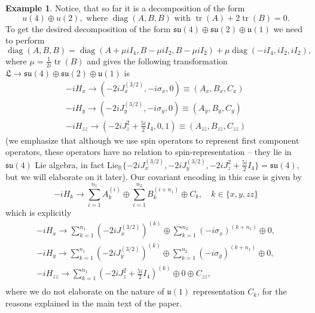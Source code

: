 \documentclass[10pt,twocolumn,superscriptaddress,aps,amsmath,amssymb,citeautoscript,floatfix,prx]{revtex4-2}
\newcounter{alg}
\theoremstyle{plain}
\theoremstyle{plain}
\theoremstyle{plain}
\theoremstyle{plain}
\theoremstyle{plain}
\theoremstyle{plain}
\newcommand{\R}{\mathbb{R}}
\newcommand{\Lie}{\mathrm{Lie}}
\theoremstyle{plain}
\theoremstyle{definition}
\newtheorem{smexample}[smtheorem]{Example}
\theoremstyle{plain}
\begin{document}
\begin{appendix}
\begin{smexample}
Notice, that so far it is a decomposition of the form
\[
    u(4) \oplus u(2),\text { where } \operatorname{diag}(A, B, B) \text { with } \operatorname{tr}(A)+2 \operatorname{tr}(B)=0.
\]
To get the desired decomposition of the form $\mathfrak{su}(4)\oplus \mathfrak{su}(2)\oplus \mathfrak{u}(1)$  we need to perform
\[
   \operatorname{diag}(A, B, B)=\operatorname{diag}(A+\mu i I_4, B-\mu i I_2, B-\mu i I_2) + \mu\operatorname{diag}\left(-i I_4, i I_2, i I_2\right),
\]
where $\mu=\frac{1}{2 i} \operatorname{tr}(B)$ and gives the following transformation $\mathfrak{L} \rightarrow \mathfrak{su}(4)\oplus \mathfrak{su}(2)\oplus \mathfrak{u}(1)$ is 
\[
\begin{gathered}
    -i H_x \longrightarrow \left(-2 i J_x^{(3 / 2)}, -i \sigma_x, 0 \right)\equiv \left(A_x, B_x, C_x \right) \\
    -i H_y \longrightarrow \left(-2 i J_y^{(3 / 2)}, -i \sigma_y, 0 \right)\equiv \left(A_y, B_y, C_y \right) \\
    -i H_{z z} \longrightarrow \left(-2 i J_z^2+\frac{5 i}{2} I_4, 0, 1\right)\equiv \left(A_{zz}, B_{zz}, C_{zz} \right)
\end{gathered}
\]
(we emphasize that although we use spin operators to represent first component operators, these operators have no relation to spin-representation -- they lie in $\mathfrak{su}(4)$ Lie algebra,
in fact $\Lie_{\R} \{-2 i J_x^{(3 / 2)}, -2 i J_y^{(3 / 2)}, -2 i J_z^2+\frac{5 i}{2} I_4\}=\mathfrak{su}(4)$, but we will elaborate on it later).
Our covariant encoding in this case is given by
\[
    -iH_k \longrightarrow \sum_{i=1}^{n_1} A_k^{(i)} \oplus \sum_{i=1}^{n_2} B_k^{(i+n_1)} \oplus C_k, \quad k\in\{x,y,zz\}
\]
which is explicitly
\[
\begin{gathered}
    -i H_x \longrightarrow \sum_{k=1}^{n_1} \left(-2 i J_x^{(3 / 2)}\right)^{(k)} \oplus \sum_{k=1}^{n_2} \left( -i \sigma_x\right)^{(k+n_1)}\oplus 0,\\
    -i H_y \longrightarrow \sum_{k=1}^{n_1} \left(-2 i J_y^{(3 / 2)}\right)^{(k)} \oplus \sum_{k=1}^{n_2} \left( -i \sigma_y\right)^{(k+n_1)}\oplus 0,\\
    -i H_{z z} \longrightarrow \sum_{k=1}^{n_1} \left(-2 i J_z^2+\frac{5 i}{2} I_4\right)^{(k)} \oplus 0 \oplus C_{zz},\\
\end{gathered}
\]
where we do not elaborate on the nature of $\mathfrak{u}(1)$ representation $C_{k}$, for the reasons explained in the main text of the paper.
\end{smexample}


\end{appendix}
\end{document}

